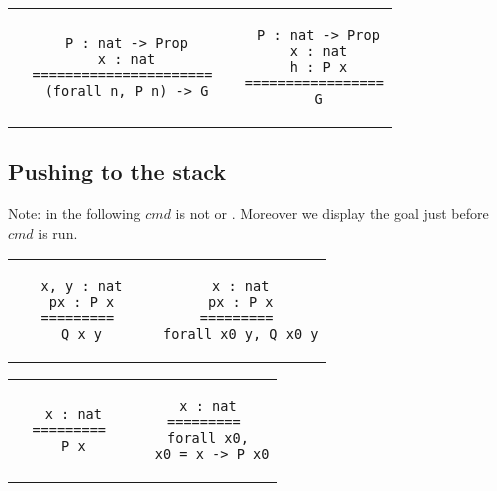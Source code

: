 \begin{landscape}
\begin{small}
\begin{multicols*}{3}[\begin{center}\section*{}\end{center}]
  \begin{tabular}{c@{$\to$}c}
  \begin{minipage}{0.17\textwidth}\begin{lstlisting}
   P : nat -> Prop
   x : nat
  ======================
   (forall n, P n) -> G
  \end{lstlisting}\end{minipage}
  &
  \begin{minipage}{0.20\textwidth}\begin{lstlisting}
   P : nat -> Prop
   x : nat
   h : P x
  =================
   G
  \end{lstlisting}\end{minipage}
  \end{tabular}

\subsection*{Pushing to the stack}
Note: in the following $cmd$ is not
 or . Moreover we display the
goal just before $cmd$ is run.

  \begin{tabular}{c@{$\to$}c}
  \begin{minipage}{0.15\textwidth}\begin{lstlisting}
   x, y : nat
   px : P x
  =========
   Q x y
  \end{lstlisting}\end{minipage}
  &
  \begin{minipage}{0.15\textwidth}\begin{lstlisting}
   x : nat
   px : P x
  =========
   forall x0 y, Q x0 y
  \end{lstlisting}\end{minipage}
  \end{tabular}

  \begin{tabular}{c@{$\to$}c}
  \begin{minipage}{0.15\textwidth}\begin{lstlisting}
   x : nat
  =========
   P x
  \end{lstlisting}\end{minipage}
  &
  \begin{minipage}{0.15\textwidth}\begin{lstlisting}
   x : nat
  =========
   forall x0,
    x0 = x -> P x0
  \end{lstlisting}\end{minipage}
  \end{tabular}


\end{multicols*}
\end{small}
\end{landscape}
